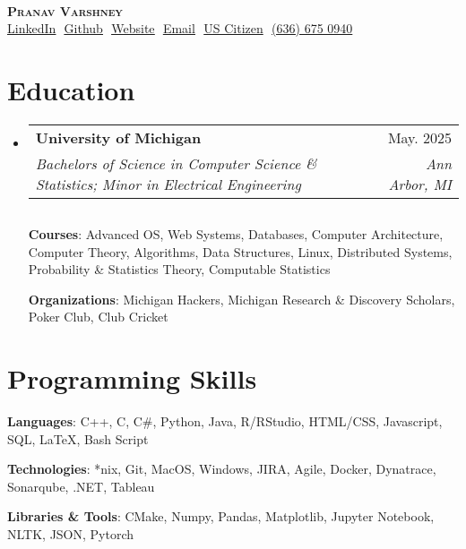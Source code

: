 \documentclass[letterpaper,11pt]{article}
\makeatletter
\newcommand{\resumeSubheading}[4]{
  \vspace{-2pt}\item
    \begin{tabular*}{0.97\textwidth}[t]{l@{\extracolsep{\fill}}r}
      \textbf{#1} & #2 \\
      \textit{\small#3} & \textit{\small #4} \\
    \end{tabular*}\vspace{-7pt}
}
\newcommand{\resumeSubHeadingListStart}{\begin{itemize}[leftmargin=0.15in, 
label={}]}
\newcommand{\resumeSubHeadingListEnd}{\end{itemize}}
\makeatother
\begin{document}

\begin{center}
\textbf{} \\ \vspace{2pt}
    \textbf{\Huge \scshape Pranav Varshney} \\ \vspace{4pt}
    \small 
    \href{https://linkedin.com/in/pvarshh}{\underline{LinkedIn}} $ $
    \href{https://github.com/pvarshh}{\underline{Github}} $ $
    \href{https://term-nav.vercel.app/}
    {\underline{Website}} $  $
    \href{mailto:pvarsh@umich.edu}
    {\underline{Email}} $ $
    {\underline{US Citizen}} $ $
    {\underline{(636) 675 0940}}
\end{center}


\section{Education}
  \resumeSubHeadingListStart
    \resumeSubheading
      {University of Michigan}{May. 2025}
      {Bachelors of Science in Computer Science \& Statistics; Minor in 
Electrical Engineering}{Ann Arbor, MI} $ $

      \textbf{Courses}{: Advanced OS, Web Systems, Databases, Computer 
Architecture, Computer Theory, Algorithms, Data Structures, Linux, 
Distributed Systems, Probability \& Statistics Theory, Computable 
Statistics}

      \vspace{-2pt}

      \textbf{Organizations}{: Michigan Hackers, Michigan Research \& 
Discovery Scholars, Poker Club, Club Cricket}
      
  \resumeSubHeadingListEnd

\section{Programming Skills}
 \begin{itemize}[leftmargin=0.15in, label={}]
    \small{\item{

     \textbf{Languages}{: C++, C, C\#, Python, Java, R/RStudio, HTML/CSS, 
Javascript, SQL, LaTeX, Bash Script} $ $

     \textbf{Technologies}{: *nix, Git, MacOS, Windows, JIRA, Agile, 
Docker, Dynatrace, Sonarqube, .NET, Tableau} $ $

     \textbf{Libraries \& Tools}{: CMake, Numpy, Pandas, Matplotlib, 
Jupyter Notebook, NLTK, JSON, Pytorch} $ $

    }}
 \end{itemize}
\end{document}
